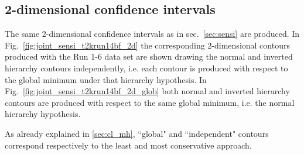 %
%

\subsection {2-dimensional confidence intervals}
\label{sec:results_bestfit}

The same 2-dimensional confidence intervals as in sec.~\ref{sec:sensi} are produced.
In Fig.~\ref{fig:joint_sensi_t2krun14bf_2d} the corresponding 2-dimensional contours produced
with the Run 1-6 data set are shown drawing the normal and inverted hierarchy contours independently,
i.e. each contour is produced with respect to the global minimum under that hierarchy hypothesis.
In Fig.~\ref{fig:joint_sensi_t2krun14bf_2d_glob} both normal and inverted hierarchy contours
are produced with respect to the same global minimum, i.e. the normal hierarchy hypothesis.

As already explained in \cref{sec:cl_mh}, ``global" and ``independent" contours correspond
respectively to the least and most conservative approach.

